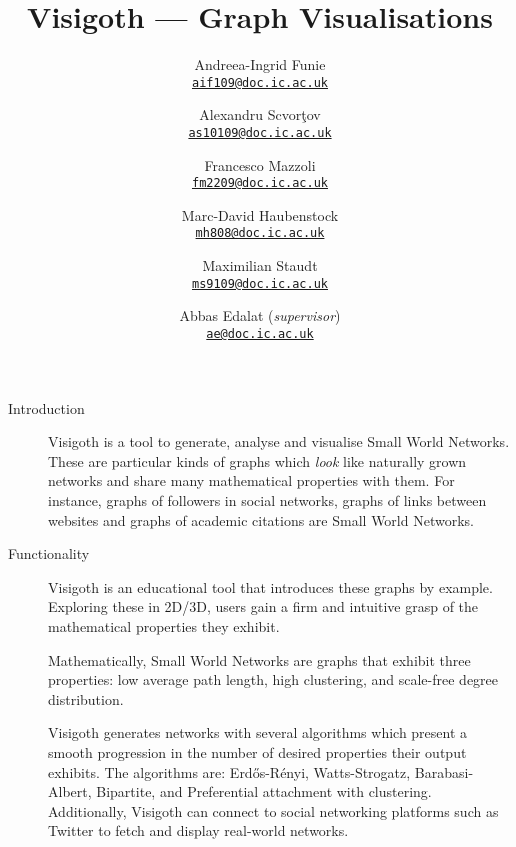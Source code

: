 \documentclass[a4paper,11pt]{article}
\let\stdhref\href
\renewcommand{\href}[2]{\stdhref{#1}{\texttt{#2}}}
\newcommand{\mailto}[1]{\href{mailto:#1}{#1}}
\begin{document}
\title{Visigoth --- Graph Visualisations}
\author{
  Andreea-Ingrid Funie\\\mailto{aif109@doc.ic.ac.uk}\and
  Alexandru Scvor\c tov\\\mailto{as10109@doc.ic.ac.uk}\and
  Francesco Mazzoli\\\mailto{fm2209@doc.ic.ac.uk}\and
  Marc-David Haubenstock\\\mailto{mh808@doc.ic.ac.uk}\and
  Maximilian Staudt\\\mailto{ms9109@doc.ic.ac.uk}
}
\date{Abbas Edalat (\emph{supervisor})\\\mailto{ae@doc.ic.ac.uk}}
\maketitle

\begin{description}
\item[Introduction]

  Visigoth is a tool to generate, analyse and visualise Small World
  Networks. These are particular kinds of graphs which \emph{look}
  like naturally grown networks and share many mathematical properties
  with them.  For instance, graphs of followers in social networks,
  graphs of links between websites and graphs of academic citations
  are Small World Networks.

  \item[Functionality]

  Visigoth is an educational tool that introduces these graphs by
  example.  Exploring these in 2D/3D, users gain a firm and intuitive
  grasp of the mathematical properties they exhibit.

  Mathematically, Small World Networks are graphs that exhibit three
  properties: low average path length, high clustering, and scale-free
  degree distribution.

  Visigoth generates networks with several algorithms which present a
  smooth progression in the number of desired properties their output
  exhibits. The algorithms are: Erd\H{o}s-R\'{e}nyi, Watts-Strogatz,
  Barabasi-Albert, Bipartite, and Preferential attachment with
  clustering. Additionally, Visigoth can connect to social networking
  platforms such as Twitter to fetch and display real-world networks.


\end{description}
\end{document}
